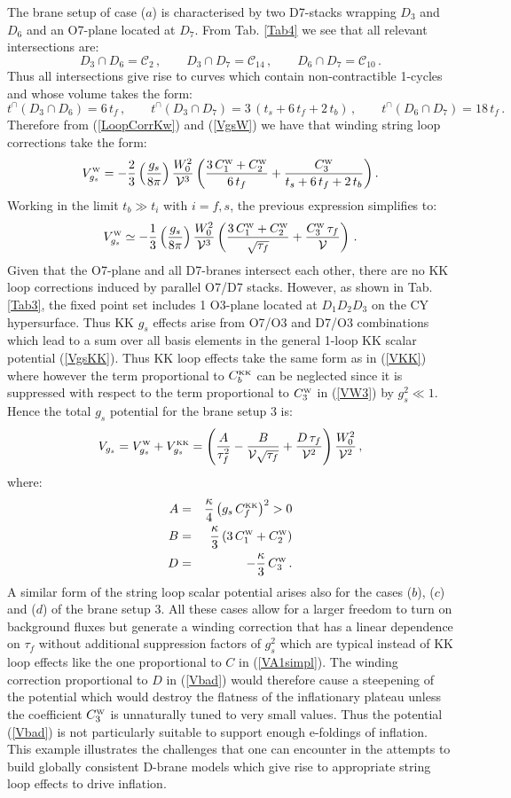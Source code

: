 \documentclass[11pt,a4paper]{article}
\newcommand{\bea}{\begin{eqnarray}}
\newcommand{\eea}{\end{eqnarray}}
\newcommand{\be}{\begin{equation}}
\newcommand{\ee}{\end{equation}}
\def\nn{\nonumber}
\def\KK{{\scriptscriptstyle \rm KK}}
\def\W{{\scriptscriptstyle \rm W}}
\newcommand\vo{{\mathcal{V}}}
\newcommand{\mc}{\mathcal}
\begin{document}
The brane setup of case ($a$) is characterised by two D7-stacks wrapping $D_3$ and $D_6$ and an O7-plane located at $D_7$. From Tab. \ref{Tab4} we see that all relevant intersections are:
\be
D_3 \cap D_6 = \mc{C}_2\,, \qquad D_3\cap D_7 = \mc{C}_{14}\,, \qquad D_6 \cap D_7 =\mc{C}_{10}\,.
\ee
Thus all intersections give rise to curves which contain non-contractible 1-cycles and whose volume takes the form: 
\be
t^\cap(D_3 \cap D_6) =  6 \, t_f \,, \qquad 
t^\cap(D_3 \cap D_7) =  3 \, ( t_s + 6 \, t_f + 2\,t_b) \,,  \qquad
t^\cap(D_6 \cap D_7) =  18 \, t_f\,.  \nn
\ee
Therefore from (\ref{LoopCorrKw}) and (\ref{VgsW}) we have that winding string loop corrections take the form:
\be
V_{g_s}^\W =-\frac23\left(\frac{g_s}{8\pi}\right) \frac{W_0^2}{\vo^3} \left(\frac{3\,C_1^\W+C_2^\W}{6 \, t_f}+\frac{C_3^\W}{t_s + 6 \, t_f + 2\,t_b}\right). 
\label{VW2}
\ee
Working in the limit $t_b\gg t_i$ with $i=f,s$, the previous expression simplifies to:
\be
V_{g_s}^\W \simeq -\frac13\left(\frac{g_s}{8\pi}\right) \frac{W_0^2}{\vo^3} \left(\frac{3\,C_1^\W+C_2^\W}{\sqrt{\tau_f}}+\frac{C_3^\W\,\tau_f}{\vo} \right) \,.
\label{VW3}
\ee
Given that the O7-plane and all D7-branes intersect each other, there are no KK loop corrections induced by parallel O7/D7 stacks. However, as shown in Tab. \ref{Tab3}, the fixed point set includes 1 O3-plane located at $D_1 D_2 D_3$ on the CY hypersurface. Thus KK $g_s$ effects arise from O7/O3 and D7/O3 combinations which lead to a sum over all basis elements in the general 1-loop KK scalar potential (\ref{VgsKK}). Thus KK loop effects take the same form as in (\ref{VKK}) where however the term proportional to $C_b^\KK$ can be neglected since it is suppressed with respect to the term proportional to $C_3^\W$ in (\ref{VW3}) by $g_s^2\ll 1$. Hence the total $g_s$ potential for the brane setup 3 is:
\be
V_{g_s} = V_{g_s}^\W + V_{g_s}^\KK = \left(\frac{A}{\tau_f^2}-\frac{B}{\vo\sqrt{\tau_f}}+\frac{D\,\tau_f}{\vo^2}\right) \frac{W_0^2}{\vo^2}\,,
\label{Vbad}
\ee
where:
\bea
A &=& \frac{\kappa}{4} \left(g_s\,C_f^\KK\right)^2 >0 \nn \\
B &=&  \frac{\kappa}{3} \left(3\,C_1^\W+ C_2^\W\right) \nn \\
D &=&  - \frac{\kappa}{3}\, C_3^\W\,. \nn
\eea
A similar form of the string loop scalar potential arises also for the cases ($b$), ($c$) and ($d$) of the brane setup 3. All these cases allow for a larger freedom to turn on background fluxes but generate a winding correction that has a linear dependence on $\tau_f$ without additional suppression factors of $g_s^2$ which are typical instead of KK loop effects like the one proportional to $C$ in (\ref{VA1simpl}). The winding correction proportional to $D$ in (\ref{Vbad}) would therefore cause a steepening of the potential which would destroy the flatness of the inflationary plateau unless the coefficient $C_3^\W$ is unnaturally tuned to very small values. Thus the potential (\ref{Vbad}) is not particularly suitable to support enough e-foldings of inflation. This example illustrates the challenges that one can encounter in the attempts to build globally consistent D-brane models which give rise to appropriate string loop effects to drive inflation. 
\end{document}
